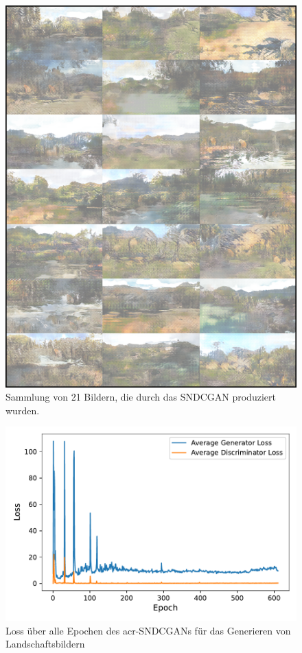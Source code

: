  \begin{figure}
 	\centering
 	\includegraphics[width=\linewidth]{images/Landschaftsbilder}
 	\caption[Ergebnisse Generierte Landschaftsbilder]{Sammlung von 21 Bildern, die durch das SNDCGAN produziert wurden.}
 	\label{fig:landschaftsbilder}
 \end{figure}
 
 
 \begin{figure}[t]
 	\centering
 	\includegraphics[width=0.7\linewidth]{images/plot_line_plot_losses_gen}
 	\caption[Losses des generirenden GANs]{\centering Loss über alle Epochen des \gls{acr-SNDCGAN}s für das Generieren von Landschaftsbildern}
 	\label{fig:plot_losses_gen}
 \end{figure}
 
